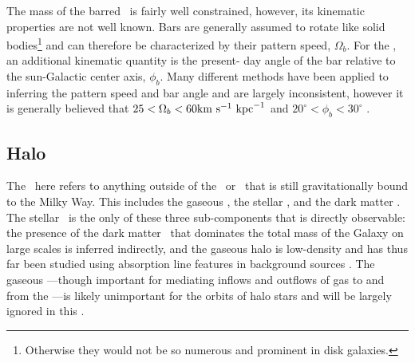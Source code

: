 The mass of the barred \mwbulge\ is fairly well constrained, however, its
kinematic properties are not well known. Bars are generally assumed to rotate
like solid bodies\footnote{Otherwise they would not be so numerous and prominent
in disk galaxies.} and can therefore be characterized by their pattern speed,
$\Omega_b$. For the \mwbulge, an additional kinematic quantity is the present-
day angle of the bar relative to the sun-Galactic center axis, $\phi_b$. Many
different methods have been applied to inferring the pattern speed and bar angle
and are largely inconsistent, however it is generally believed that $25 <
\Omega_b < 60 \mathrm{km}~\mathrm{s}^{-1}~\mathrm{kpc}^{-1}$ and $20^\circ < \phi_b < 30^\circ$ \citep{dwek95,
stanek97, debattista02, shen10, wegg13, cao13, wegg15, portail15}.



\subsection{Halo} \label{sec:mw-halo}

The \mwhalo\ here refers to anything outside of the \mwdisk\ or \mwbulge\ that
is still gravitationally bound to the Milky Way. This includes the gaseous
\mwhalo, the stellar \mwhalo, and the dark matter \mwhalo. The stellar \mwhalo\
is the only of these three sub-components that is directly observable: the
presence of the dark matter \mwhalo\ that dominates the total mass of the Galaxy
on large scales is inferred indirectly, and the gaseous halo is low-density and
has thus far been studied using absorption line features in background sources
\citep{miller13}. The gaseous \mwhalo---though important for mediating inflows
and outflows of gas to and from the \mwdisk---is likely unimportant for the
orbits of halo stars and will be largely ignored in this \article. %
\citep[$M_{\rm h:g} \approx 10^{10}~\msun$;][]{blitz00, salem15}

